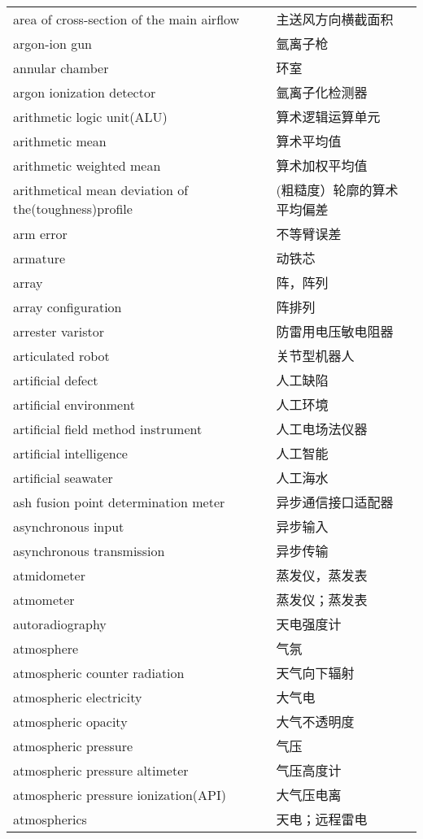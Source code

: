 \documentclass[
]{article}
\begin{document}
\begin{longtable}[]{@{}ll@{}}
area of cross-section of the main airflow & 主送风方向横截面积 \\
argon-ion gun & 氩离子枪 \\
annular chamber & 环室 \\
argon ionization detector & 氩离子化检测器 \\
arithmetic logic unit(ALU) & 算术逻辑运算单元 \\
arithmetic mean & 算术平均值 \\
arithmetic weighted mean & 算术加权平均值 \\
arithmetical mean deviation of the(toughness)profile &
(粗糙度）轮廓的算术平均偏差 \\
arm error & 不等臂误差 \\
armature & 动铁芯 \\
array & 阵，阵列 \\
array configuration & 阵排列 \\
arrester varistor & 防雷用电压敏电阻器 \\
articulated robot & 关节型机器人 \\
artificial defect & 人工缺陷 \\
artificial environment & 人工环境 \\
artificial field method instrument & 人工电场法仪器 \\
artificial intelligence & 人工智能 \\
artificial seawater & 人工海水 \\
ash fusion point determination meter & 异步通信接口适配器 \\
asynchronous input & 异步输入 \\
asynchronous transmission & 异步传输 \\
atmidometer & 蒸发仪，蒸发表 \\
atmometer & 蒸发仪；蒸发表 \\
autoradiography & 天电强度计 \\
atmosphere & 气氛 \\
atmospheric counter radiation & 天气向下辐射 \\
atmospheric electricity & 大气电 \\
atmospheric opacity & 大气不透明度 \\
atmospheric pressure & 气压 \\
atmospheric pressure altimeter & 气压高度计 \\
atmospheric pressure ionization(API) & 大气压电离 \\
atmospherics & 天电；远程雷电 \\

\end{longtable}
\end{document}
